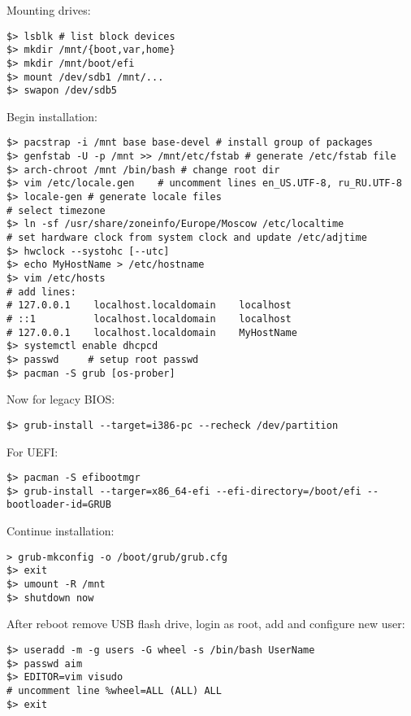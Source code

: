 \documentclass[a4paper, 12pt]{article}
\begin{document}
Mounting drives:
\begin{lstlisting}
$> lsblk # list block devices
$> mkdir /mnt/{boot,var,home}
$> mkdir /mnt/boot/efi
$> mount /dev/sdb1 /mnt/...
$> swapon /dev/sdb5
\end{lstlisting}

Begin installation:
\begin{lstlisting}
$> pacstrap -i /mnt base base-devel # install group of packages
$> genfstab -U -p /mnt >> /mnt/etc/fstab # generate /etc/fstab file
$> arch-chroot /mnt /bin/bash # change root dir
$> vim /etc/locale.gen    # uncomment lines en_US.UTF-8, ru_RU.UTF-8
$> locale-gen # generate locale files
# select timezone
$> ln -sf /usr/share/zoneinfo/Europe/Moscow /etc/localtime
# set hardware clock from system clock and update /etc/adjtime
$> hwclock --systohc [--utc]
$> echo MyHostName > /etc/hostname
$> vim /etc/hosts
# add lines:
# 127.0.0.1    localhost.localdomain    localhost
# ::1          localhost.localdomain    localhost
# 127.0.0.1    localhost.localdomain    MyHostName
$> systemctl enable dhcpcd
$> passwd     # setup root passwd
$> pacman -S grub [os-prober]
\end{lstlisting}

Now for legacy BIOS:
\begin{lstlisting}
$> grub-install --target=i386-pc --recheck /dev/partition
\end{lstlisting}

For UEFI:
\begin{lstlisting}
$> pacman -S efibootmgr
$> grub-install --targer=x86_64-efi --efi-directory=/boot/efi --bootloader-id=GRUB
\end{lstlisting}

Continue installation:
\begin{lstlisting}
> grub-mkconfig -o /boot/grub/grub.cfg
$> exit
$> umount -R /mnt
$> shutdown now
\end{lstlisting}

After reboot remove USB flash drive, login as root, add and configure new user:
\begin{lstlisting}
$> useradd -m -g users -G wheel -s /bin/bash UserName
$> passwd aim
$> EDITOR=vim visudo
# uncomment line %wheel=ALL (ALL) ALL
$> exit
\end{lstlisting}
\end{document}
